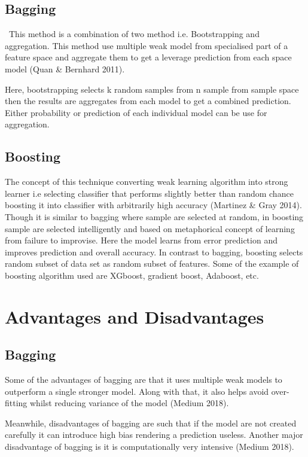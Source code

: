 \documentclass{article}
\begin{document}
\subsection{Bagging}\
This method is a combination of two method i.e. Bootstrapping and aggregation. This method use multiple weak model from specialised part of a feature space and aggregate them to get a leverage prediction from each space model (Quan & Bernhard 2011).

Here, bootstrapping selects k random samples from n sample from sample space then the results are aggregates from each model to get a combined prediction. Either probability or prediction of each individual model can be use for aggregation.

\subsection{Boosting}\label{SEC:Methods }
The concept of this technique converting weak learning algorithm into strong learner i.e selecting classifier that performs slightly better than random chance boosting it into classifier with arbitrarily high accuracy (Martinez & Gray 2014). Though it is similar to bagging where sample are selected at random, in boosting sample are selected intelligently and based on metaphorical concept of learning from failure to improvise. Here the model learns from error prediction and improves prediction and overall accuracy. In contrast to bagging, boosting selects random subset of data set as random subset of features. Some of the example of boosting algorithm used are XGboost, gradient boost, Adaboost, etc.
    

\section{Advantages and Disadvantages}
\subsection{Bagging}\label{sec:Bagging}
Some of the advantages of bagging are that it uses multiple weak models to outperform a single stronger model. Along with that, it also helps avoid over-fitting whilst reducing variance of the model (Medium 2018).

Meanwhile, disadvantages of bagging are such that if the model are not created carefully it can introduce high bias rendering a prediction useless. Another major disadvantage of bagging is it is computationally very intensive (Medium 2018).
\end{document}
